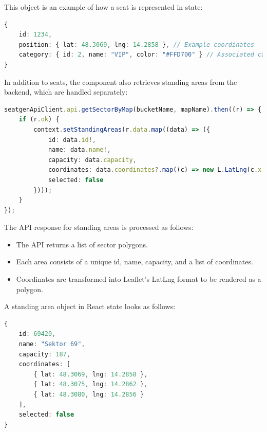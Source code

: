 \newpage

This object is an example of how a seat is represented in state:

\begin{lstlisting}[language=TypeScript, caption=Seat Object in State, label=lst:seat-object]
{
    id: 1234,
    position: { lat: 48.3069, lng: 14.2858 }, // Example coordinates
    category: { id: 2, name: "VIP", color: "#FFD700" } // Associated category
}
\end{lstlisting}

In addition to seats, the component also retrieves standing areas from the backend, which are handled separately:

\begin{lstlisting}[language=TypeScript, caption=Fetching Standing Areas, label=lst:fetch-standingareas]
seatgenApiClient.api.getSectorByMap(bucketName, mapName).then((r) => {
    if (r.ok) {
        context.setStandingAreas(r.data.map((data) => ({
            id: data.id!,
            name: data.name!,
            capacity: data.capacity,
            coordinates: data.coordinates?.map((c) => new L.LatLng(c.x!, c.y!)) ?? [],
            selected: false
        })));
    }
});
\end{lstlisting}

The API response for standing areas is processed as follows:
\begin{itemize}
    \item The API returns a list of sector polygons.
    \item Each area consists of a unique id, name, capacity, and a list of coordinates.
    \item Coordinates are transformed into Leaflet’s LatLng format to be rendered as a polygon.
\end{itemize}

A standing area object in React state looks as follows:
\begin{lstlisting}[language=TypeScript, caption=Standing Area Object in State, label=lst:standingarea-object]
{
    id: 69420,
    name: "Sektor 69",
    capacity: 187,
    coordinates: [
        { lat: 48.3069, lng: 14.2858 },
        { lat: 48.3075, lng: 14.2862 },
        { lat: 48.3080, lng: 14.2856 }
    ],
    selected: false
}
\end{lstlisting}


